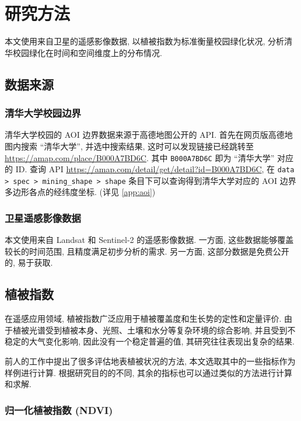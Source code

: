 
\section{研究方法}

本文使用来自卫星的遥感影像数据, 以植被指数为标准衡量校园绿化状况, 分析清华校园绿化在时间和空间维度上的分布情况.

\subsection{数据来源}

\subsubsection{清华大学校园边界}

清华大学校园的 AOI 边界数据来源于高德地图公开的 API.
首先在网页版高德地图内搜索 ``清华大学'', 并选中搜索结果, 这时可以发现链接已经跳转至 \url{https://amap.com/place/B000A7BD6C}.
其中 \verb|B000A7BD6C| 即为 ``清华大学'' 对应的 ID.
查询 API \url{https://amap.com/detail/get/detail?id=B000A7BD6C}, 在 \verb|data > spec > mining_shape > shape| 条目下可以查询得到清华大学对应的 AOI 边界多边形各点的经纬度坐标. (详见 \cref{app:aoi})

\subsubsection{卫星遥感影像数据}

本文使用来自 Landsat 和 Sentinel-2 的遥感影像数据.\cite{claverie_harmonized_2018}
一方面, 这些数据能够覆盖较长的时间范围, 且精度满足初步分析的需求.
另一方面, 这部分数据是免费公开的, 易于获取.

\subsection{植被指数}

在遥感应用领域, 植被指数广泛应用于植被覆盖度和生长势的定性和定量评价.
由于植被光谱受到植被本身、光照、土壤和水分等复杂环境的综合影响, 并且受到不稳定的大气变化影响, 因此没有一个稳定普遍的值, 其研究往往表现出复杂的结果.\cite{__1998}

前人的工作中提出了很多评估地表植被状况的方法\cite{bannari_review_1995}, 本文选取其中的一些指标作为样例进行计算.
根据研究目的的不同, 其余的指标也可以通过类似的方法进行计算和求解.

\subsubsection{归一化植被指数 (NDVI)}

